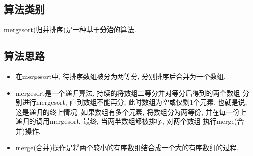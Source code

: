 \subsection{算法类别}
mergesort(归并排序)是一种基于\textbf{分治}的算法.
\subsection{算法思路}
\begin{itemize}
	\item 在mergesort中, 待排序数组被分为两等分, 分别排序后合并为一个数组.
	\item mergesort是一个递归算法, 持续的将数组二等分并对等分后得到的两个数组
分别进行mergesort, 直到数组不能再分, 此时数组为空或仅剩1个元素.
也就是说, 这是递归的终止情况. 如果数组有多个元素, 将数组分为两等份,
并在每一份上递归的调用mergesort. 最终, 当两半数组都被排序, 对两个数组
执行merge(合并)操作.
	\item merge(合并)操作是将两个较小的有序数组结合成一个大的有序数组的过程.
\end{itemize}
